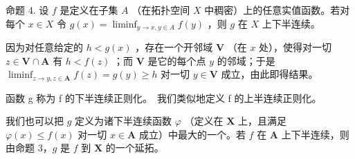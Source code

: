 命题 4. 设 \(f\) 是定义在子集 \(A\) （在拓扑空间 \(X\) 中稠密）上的任意实值函数。若对每个 \(x \in X\) 令 \(g(x) = \liminf_{y \to x, y \in A} f(y)\) ，则 \(g\) 在 \(X\) 上下半连续。

因为对任意给定的 \(h < g(x)\) ，存在一个开邻域 \(\mathbf{V}\) （在 \(x\) 处），使得对一切 \(z \in \mathbf{V} \cap \mathbf{A}\) 有 \(h < f(z)\) ；而 \(\mathbf{V}\) 是它的每个点 \(y\) 的邻域；于是 \(\liminf_{z \to y, z \in \mathbf{A}} f(z) = g(y) \geqslant h\) 对一切 \(y \in \mathbf{V}\) 成立，由此即得结果。

函数 g 称为 f 的下半连续正则化。~我们类似地定义 f 的上半连续正则化。

我们也可以把 \(g\) 定义为诸下半连续函数 \(\varphi\) （定义在 \(\mathbf{X}\) 上，且满足 \(\varphi(x) \leqslant f(x)\) 对一切 \(x \in \mathbf{A}\) 成立）中最大的一个。若 \(f\) 在 \(\mathbf{A}\) 上下半连续，则由命题 3，\(g\) 是 \(f\) 到 \(\mathbf{X}\) 的一个延拓。

